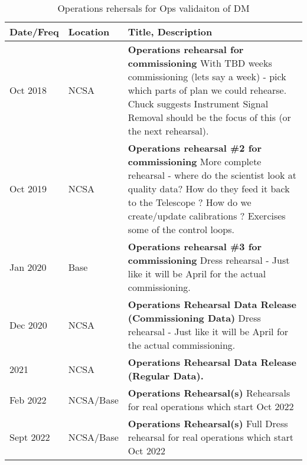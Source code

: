 \begin{longtable} {|l|l|p{}|}
	\caption{Operations rehersals for Ops validaiton of DM \label{tab:ors}}\\  %
	\hline
{\bf Date/Freq} &{\bf Location}& {\bf Title, Description} \\ \hline

Oct 2018 &  NCSA & {\bf Operations rehearsal for commissioning }
	With TBD weeks commissioning (lets say a week) - pick which parts of plan we could rehearse.
	Chuck suggests Instrument Signal Removal should be the focus of this (or the next rehearsal).
	\\ \hline
Oct 2019 & NCSA &  {\bf  Operations rehearsal \#2 for commissioning}
More complete rehearsal - where do the scientist look at quality data? How do they feed it back to the Telescope ?
How do we create/update calibrations ? Exercises some of the control loops.
\\ \hline
Jan 2020 & Base  &  {\bf  Operations rehearsal \#3 for commissioning}
Dress rehearsal - Just like it will be April for the actual commissioning.
	\\ \hline
Dec 2020 &  NCSA &  {\bf Operations  Rehearsal Data Release (Commissioning Data)}
	Dress rehearsal - Just like it will be April for the actual commissioning.
	\\ \hline

2021 &  NCSA &  {\bf Operations  Rehearsal Data Release (Regular Data).}
	\\ \hline

Feb 2022 &  NCSA/Base &  {\bf Operations  Rehearsal(s)}
Rehearsals for real operations which start Oct 2022
	\\ \hline
Sept 2022 &  NCSA/Base &  {\bf Operations  Rehearsal(s)}
Full Dress rehearsal for real operations which start Oct 2022
	\\ \hline


\end{longtable}
